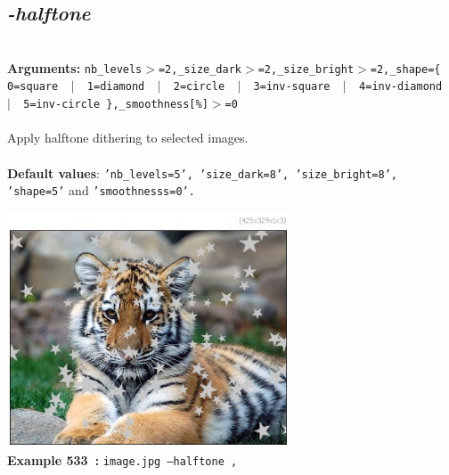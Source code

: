 \documentclass[a4paper,11pt,twoside]{book}
\begin{document}
\subsection{\emph{-halftone} }\vspace*{-0.5em}
~\\\textbf{Arguments: } 
{\small \texttt{nb\_levels$>$=2,\_size\_dark$>$=2,\_size\_bright$>$=2,\_shape=\{ 0=square ~$|$~ 1=diamond ~$|$~ 2=circle ~$|$~ 3=inv-square ~$|$~ 4=inv-diamond ~$|$~ 5=inv-circle \},\_smoothness[\%]$>$=0}}\\~\\
Apply halftone dithering to selected images.
~\\~\\\textbf{Default values}: {\small \texttt{'nb\_levels=5', 'size\_dark=8', 'size\_bright=8', 'shape=5'} and \texttt{'smoothnesss=0'.}}
\begin{center}\includegraphics[keepaspectratio=true,height=7cm,width=\textwidth]{img/gmic_def533.jpg}\\
{\footnotesize \textbf{Example 533~:} \texttt{image.jpg --halftone ,}}
\end{center}
\end{document}
